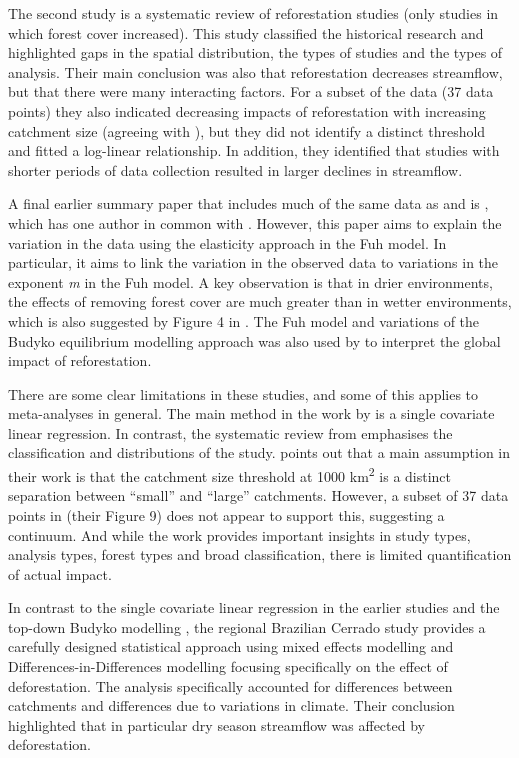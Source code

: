\documentclass[]{elsarticle} %
\begin{document}
The second study \citep{filoso2017} is a systematic review of reforestation studies (only studies in which forest cover increased). This study classified the historical research and highlighted gaps in the spatial distribution, the types of studies and the types of analysis. Their main conclusion was also that reforestation decreases streamflow, but that there were many interacting factors. For a subset of the data (37 data points) they also indicated decreasing impacts of reforestation with increasing catchment size (agreeing with \citet{zhang2017}), but they did not identify a distinct threshold and fitted a log-linear relationship. In addition, they identified that studies with shorter periods of data collection resulted in larger declines in streamflow.

A final earlier summary paper that includes much of the same data as \citet{zhang2017} and \citet{filoso2017} is \citet{zhou2015}, which has one author in common with \citet{zhang2017}. However, this paper aims to explain the variation in the data using the elasticity approach in the Fuh model. In particular, it aims to link the variation in the observed data to variations in the exponent \emph{m} in the Fuh model. A key observation is that in drier environments, the effects of removing forest cover are much greater than in wetter environments, which is also suggested by Figure 4 in \citet{zhang2017}. The Fuh model and variations of the Budyko equilibrium modelling approach was also used by \citet{hoekvandijke2022} to interpret the global impact of reforestation.

There are some clear limitations in these studies, and some of this applies to meta-analyses in general. The main method in the work by \citet{zhang2017} is a single covariate linear regression. In contrast, the systematic review from \citet{filoso2017} emphasises the classification and distributions of the study. \citet{zhang2017} points out that a main assumption in their work is that the catchment size threshold at 1000 km\textsuperscript{2} is a distinct separation between ``small'' and ``large'' catchments. However, a subset of 37 data points in \citet{filoso2017} (their Figure 9) does not appear to support this, suggesting a continuum. And while the work \citet{filoso2017} provides important insights in study types, analysis types, forest types and broad classification, there is limited quantification of actual impact.

In contrast to the single covariate linear regression in the earlier studies \citep{zhang2017, filoso2017} and the top-down Budyko modelling \citep{zhou2015, hoekvandijke2022}, the regional Brazilian Cerrado study \citep{levy2018} provides a carefully designed statistical approach using mixed effects modelling and Differences-in-Differences modelling focusing specifically on the effect of deforestation. The analysis specifically accounted for differences between catchments and differences due to variations in climate. Their conclusion highlighted that in particular dry season streamflow was affected by deforestation.
\end{document}
